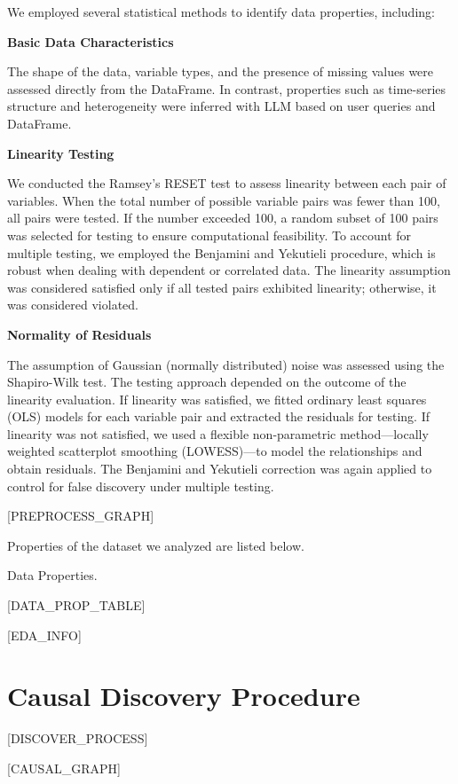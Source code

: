 \documentclass{article}
\begin{document}
We employed several statistical methods to identify data properties, including:

\textbf{Basic Data Characteristics}

The shape of the data, variable types, and the presence of missing values were assessed directly from the DataFrame. 
In contrast, properties such as time-series structure and heterogeneity were inferred with LLM based on user queries and DataFrame.

\textbf{Linearity Testing}

We conducted the Ramsey's RESET test to assess linearity between each pair of variables. When the total number of possible variable pairs was fewer than 100, all pairs were tested. If the number exceeded 100, a random subset of 100 pairs was selected for testing to ensure computational feasibility. 
To account for multiple testing, we employed the Benjamini and Yekutieli procedure, which is robust when dealing with dependent or correlated data. 
The linearity assumption was considered satisfied only if all tested pairs exhibited linearity; otherwise, it was considered violated.

\textbf{Normality of Residuals}

The assumption of Gaussian (normally distributed) noise was assessed using the Shapiro-Wilk test. 
The testing approach depended on the outcome of the linearity evaluation. 
If linearity was satisfied, we fitted ordinary least squares (OLS) models for each variable pair and extracted the residuals for testing. 
If linearity was not satisfied, we used a flexible non-parametric method—locally weighted scatterplot smoothing (LOWESS)—to model the relationships and obtain residuals. 
The Benjamini and Yekutieli correction was again applied to control for false discovery under multiple testing.


[PREPROCESS_GRAPH]

Properties of the dataset we analyzed are listed below.

\begin{table}[H]
    \centering
    \caption{Data Properties.}
[DATA_PROP_TABLE]
\end{table}

[EDA_INFO]

\section{Causal Discovery Procedure}
[DISCOVER_PROCESS]

[CAUSAL_GRAPH]
\end{document}

